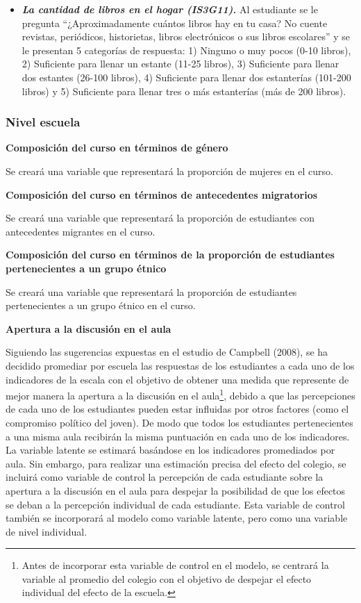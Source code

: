 \documentclass[12pt,twoside]{templates/facsothesis}
\begin{document}
\begin{itemize}
\item
  \textbf{\emph{La cantidad de libros en el hogar (IS3G11).}} Al estudiante se le pregunta ``¿Aproximadamente cuántos libros hay en tu casa? No cuente revistas, periódicos, historietas, libros electrónicos o sus libros escolares'' y se le presentan 5 categorías de respuesta: 1) Ninguno o muy pocos (0-10 libros), 2) Suficiente para llenar un estante (11-25 libros), 3) Suficiente para llenar dos estantes (26-100 libros), 4) Suficiente para llenar dos estanterías (101-200 libros) y 5) Suficiente para llenar tres o más estanterías (más de 200 libros).
\end{itemize}

\hypertarget{nivel-escuela}{%
\subsubsection{Nivel escuela}\label{nivel-escuela}}

\textbf{Composición del curso en términos de género}

Se creará una variable que representará la proporción de mujeres en el curso.

\textbf{Composición del curso en términos de antecedentes migratorios}

Se creará una variable que representará la proporción de estudiantes con antecedentes migrantes en el curso.

\textbf{Composición del curso en términos de la proporción de estudiantes pertenecientes a un grupo étnico}

Se creará una variable que representará la proporción de estudiantes pertenecientes a un grupo étnico en el curso.

\textbf{Apertura a la discusión en el aula}

Siguiendo las sugerencias expuestas en el estudio de Campbell (2008), se ha decidido promediar por escuela las respuestas de los estudiantes a cada uno de los indicadores de la escala con el objetivo de obtener una medida que represente de mejor manera la apertura a la discusión en el aula\footnote{Antes de incorporar esta variable de control en el modelo, se centrará la variable al promedio del colegio con el objetivo de despejar el efecto individual del efecto de la escuela.}, debido a que las percepciones de cada uno de los estudiantes pueden estar influidas por otros factores (como el compromiso político del joven). De modo que todos los estudiantes pertenecientes a una misma aula recibirán la misma puntuación en cada uno de los indicadores. La variable latente se estimará basándose en los indicadores promediados por aula. Sin embargo, para realizar una estimación precisa del efecto del colegio, se incluirá como variable de control la percepción de cada estudiante sobre la apertura a la discusión en el aula para despejar la posibilidad de que los efectos se deban a la percepción individual de cada estudiante. Esta variable de control también se incorporará al modelo como variable latente, pero como una variable de nivel individual.
\end{document}
